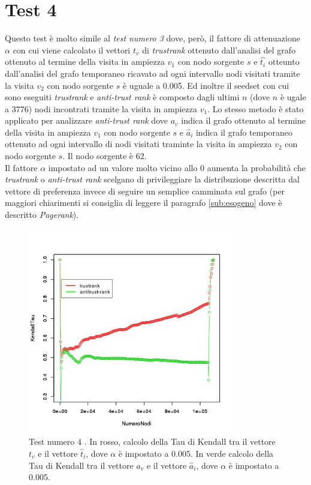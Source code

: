 \section{Test 4}
Questo test è molto simile al \textit{test numero 3} dove, però, il fattore di attenuazione \(\alpha\) con cui viene calcolato il vettori \(t_v\) di \textit{trustrank} ottenuto dall'analisi del grafo ottenuto al termine della visita in ampiezza \(v_1\) con nodo sorgente \(s\) e \(\hat{t_i}\) otteunto dall'analisi del grafo temporaneo ricavato ad ogni intervallo nodi visitati tramite la visita \(v_2\) con nodo sorgente \(s\) è uguale a 0.005. Ed inoltre il seedset con cui sono eseguiti \textit{trustrank} e \textit{anti-trust rank} è composto dagli ultimi \(n\) (dove \(n\) è ugale a 3776) nodi incontrati tramite la visita in ampiezza \(v_1\). Lo stesso metodo è stato applicato per analizzare \textit{anti-trust rank} dove \(a_v\) indica il grafo ottenuto al termine della visita in ampiezza \(v_1\) con nodo sorgente \(s\) e \(\hat{a}_i\) indica il grafo temporaneo ottenuto ad ogni intervallo di nodi visitati traminte la visita in ampiezza \(v_2\) con nodo sorgente \(s\). Il nodo sorgente è 62.\\
Il fattore \(\alpha\) impostato ad un valore molto vicino allo 0 aumenta la probabilità che \textit{trustrank} o \textit{anti-trust rank} scelgano di privileggiare la distribuzione descritta dal vettore di preferenza invece di seguire un semplice camminata sul grafo (per maggiori chiarimenti si consiglia di leggere il paragrafo \ref{sub:esogeno} dove è descritto \textit{Pagerank}).
\begin{figure}
 \centering
 \includegraphics[height=9cm]{immagini/test4/coplotTrustAnti_Mode1_set3776_62_alpha0005}
  \caption{Test numero 4 . In rosso, calcolo della Tau di Kendall tra il vettore $t_v$ e il vettore $\hat{t}_i$, dove $\alpha$ è impostato a 0.005. In verde calcolo della Tau di Kendall tra il vettore $a_v$ e il vettore $\hat{a}_i$, dove $\alpha$ è impostato a 0.005.}
 \label{fig:test4coplotTrustAntiModeB620005}
\end{figure}

